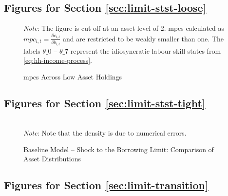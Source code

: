 \documentclass[12pt]{article} %
\numberwithin{equation}{section} %
\numberwithin{figure}{section}
\numberwithin{table}{section}
\begin{document}
\begin{refsection}
\begin{appendices}
\subsection{Figures for Section \ref{sec:limit-stst-loose}}
\label{sec-app:figures-limit-loose}

\begin{figure}[H]
    \centering
    \caption{\Gls{mpc}s Across Low Asset Holdings}
    \label{fig:baseline-limit-initial-mpcs}
    

    \vspace{10pt}
    
    \begin{minipage}{0.75\textwidth}
    \footnotesize
    \textit{Note}: The figure is cut off at an asset level of $2$. \Gls{mpc}s calculated as $mpc_{i,t} = \frac{\partial c_{i,t}}{\partial b_{i,t}}$ and are restricted to be weakly smaller than one. The labels $\theta\_0$ -- $\theta\_7$ represent the idiosyncratic labour skill states from \eqref{eq:hh-income-process}.
    \end{minipage}
\end{figure}

\subsection{Figures for Section \ref{sec:limit-stst-tight}}
\label{sec-app:figures-limit-tight}

\begin{sidewaysfigure}
    \caption{Baseline Model -- Shock to the Borrowing Limit: Comparison
 of Asset Distributions}
    \label{fig:comparison-stst-baseline-dist}
    \centering

    \\
     \centering
	\textit{Note}: Note that the density is due to numerical errors.
\end{sidewaysfigure}

\subsection{Figures for Section \ref{sec:limit-transition}}
\label{sec-app:figures-limit-transition}


\end{appendices}
\end{refsection}
\end{document}
